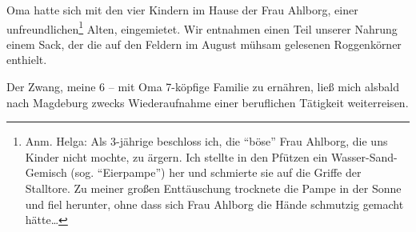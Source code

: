 Oma hatte sich mit den vier Kindern im Hause der Frau Ahlborg, einer unfreundlichen\footnote{Anm. Helga: Als 3-jährige beschloss ich, die \enquote{böse} Frau Ahlborg, die uns Kinder nicht mochte, zu ärgern. Ich stellte in den Pfützen ein Wasser-Sand-Gemisch (sog. \enquote{Eierpampe}) her und schmierte sie auf die Griffe der Stalltore. Zu meiner großen Enttäuschung trocknete die Pampe in der Sonne und fiel herunter, ohne dass sich Frau Ahlborg die Hände schmutzig gemacht hätte\dots} Alten, eingemietet. Wir entnahmen einen Teil unserer Nahrung einem Sack, der die auf den Feldern im August mühsam gelesenen Roggenkörner enthielt.

 Der Zwang, meine 6 -- mit Oma 7-köpfige Familie zu ernähren, ließ mich alsbald nach Magdeburg zwecks Wiederaufnahme einer beruflichen Tätigkeit weiterreisen.

